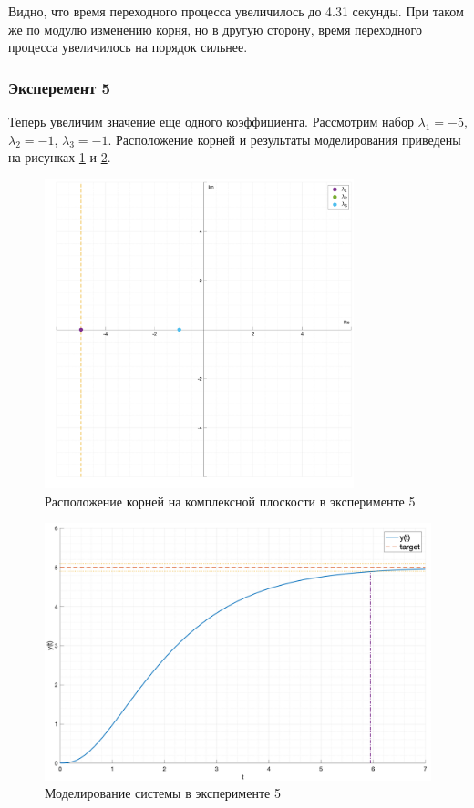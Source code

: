 Видно, что время переходного процесса увеличилось до 4.31 секунды. При таком же по модулю 
изменению корня, но в другую сторону, время переходного процесса увеличилось на порядок сильнее. 

\subsubsection{Эксперемент 5}
\label{task2_case5}
Теперь увеличим значение еще одного коэффициента. Рассмотрим набор
$\lambda_1 = -5$, $\lambda_2 = -1$, $\lambda_3 = -1$. 
Расположение корней и результаты моделирования приведены на рисунках
\ref{fig:task_2_points5} и \ref{fig:task_2_case5}.

\begin{figure}
    \centering
    \includegraphics[width=0.8\textwidth]{media/plots/task2_points5.png}
    \caption{Расположение корней на комплексной плоскости в эксперименте 5}
    \label{fig:task_2_points5}
\end{figure}

\begin{figure}
    \centering
    \includegraphics[width=\textwidth]{media/plots/task2_case5.png}
    \caption{Моделирование системы в эксперименте 5}
    \label{fig:task_2_case5}
\end{figure}

